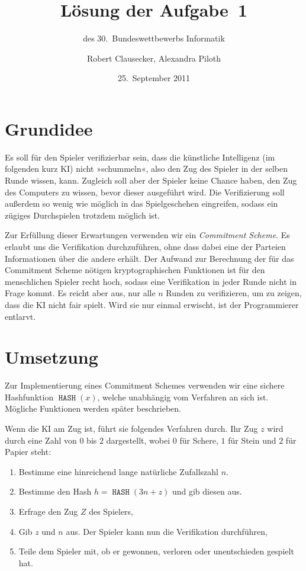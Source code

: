 \documentclass{scrartcl}
\title{Lösung der Aufgabe~1}
\subtitle{des 30.~Bundeswettbewerbs Informatik}
\author{Robert Clausecker, Alexandra Piloth}
\date{25.~September 2011}
\DeclareMathOperator{\hash}{\texttt{HASH}}
\begin{document}
\maketitle

\section{Grundidee}
Es soll für den Spieler verifizierbar sein, dass die künstliche Intelligenz (im
folgenden kurz KI) nicht »schummeln«, also den Zug des Spieler in der selben
Runde wissen, kann.  Zugleich soll aber der Spieler keine Chance haben, den Zug
des Computers zu wissen, bevor dieser ausgeführt wird.  Die Verifizierung soll
außerdem so wenig wie möglich in das Spielgeschehen eingreifen, sodass ein
zügiges Durchspielen trotzdem möglich ist.

Zur Erfüllung dieser Erwartungen verwenden wir ein \emph{Commitment Scheme}.  Es
erlaubt uns die Verifikation durchzuführen, ohne dass dabei eine der Parteien
Informationen über die andere erhält.  Der Aufwand zur Berechnung der für das
Commitment Scheme nötigen kryptographischen Funktionen ist für den menschlichen
Spieler recht hoch, sodass eine Verifikation in jeder Runde nicht in Frage
kommt.  Es reicht aber aus, nur alle $n$ Runden zu verifizieren, um zu zeigen,
dass die KI nicht fair spielt. Wird sie nur einmal erwischt, ist der
Programmierer entlarvt.

\section{Umsetzung}
Zur Implementierung eines Commitment Schemes verwenden wir eine sichere
Hashfunktion $\hash(x)$, welche unabhängig vom Verfahren an sich ist.  Mögliche
Funktionen werden später beschrieben.

Wenn die KI am Zug ist, führt sie folgendes Verfahren durch. Ihr Zug $z$ wird
durch eine Zahl von $0$ bis $2$ dargestellt, wobei $0$ für Schere, $1$ für Stein
und $2$ für Papier steht:
\begin{enumerate}
\item Bestimme eine hinreichend lange natürliche Zufallszahl $n$.
\item Bestimme den Hash $h = \hash(3n+z)$ und gib diesen aus.
\item Erfrage den Zug $Z$ des Spielers,
\item Gib $z$ und $n$ aus. Der Spieler kann nun die Verifikation durchführen,
\item Teile dem Spieler mit, ob er gewonnen, verloren oder unentschieden
  gespielt hat.
\end{enumerate}
\end{document}
